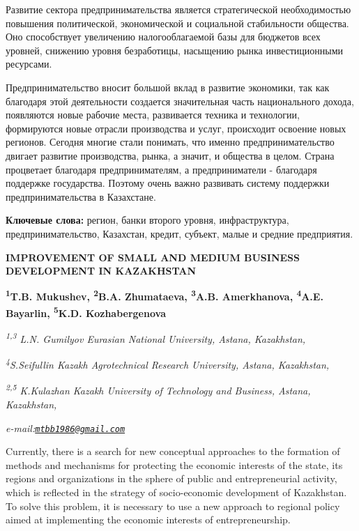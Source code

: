 Развитие сектора предпринимательства является стратегической
необходимостью повышения политической, экономической и социальной
стабильности общества. Оно способствует увеличению налогооблагаемой базы
для бюджетов всех уровней, снижению уровня безработицы, насыщению рынка
инвестиционными ресурсами.

Предпринимательство вносит большой вклад в развитие экономики, так как
благодаря этой деятельности создается значительная часть национального
дохода, появляются новые рабочие места, развивается техника и
технологии, формируются новые отрасли производства и услуг, происходит
освоение новых регионов. Сегодня многие стали понимать, что именно
предпринимательство двигает развитие производства, рынка, а значит, и
общества в целом. Страна процветает благодаря предпринимателям, а
предприниматели - благодаря поддержке государства. Поэтому очень важно
развивать систему поддержки предпринимательства в Казахстане.

{\bfseries Ключевые слова:} регион, банки второго уровня, инфраструктура,
предпринимательство, Казахстан, кредит, субъект, малые и средние
предприятия.

{\bfseries IMPROVEMENT OF SMALL AND MEDIUM BUSINESS DEVELOPMENT IN KAZAKHSTAN}

\begin{articleheader}
{\bfseries
\textsuperscript{1}T.B. Mukushev\textsuperscript{\envelope },
\textsuperscript{2}B.A. Zhumataeva,
\textsuperscript{3}A.B. Amerkhanova,
\textsuperscript{4}A.E. Bayarlin,
\textsuperscript{5}K.D. Kozhabergenova}
\end{articleheader}

\begin{affiliation}
\emph{\textsuperscript{1,3} L.N. Gumilyov Eurasian National University, Astana, Kazakhstan,}

\emph{\textsuperscript{4}S.Seifullin Kazakh Agrotechnical Research University, Astana, Kazakhstan,}

\emph{\textsuperscript{2,5} K.Kulazhan Kazakh University of Technology and Business, Astana, Kazakhstan,}

\emph{e-mail:\href{mailto:mtbb1986@gmail.com}{\nolinkurl{mtbb1986@gmail.com}}}
\end{affiliation}

Currently, there is a search for new conceptual approaches to the
formation of methods and mechanisms for protecting the economic
interests of the state, its regions and organizations in the sphere of
public and entrepreneurial activity, which is reflected in the strategy
of socio-economic development of Kazakhstan. To solve this problem, it
is necessary to use a new approach to regional policy aimed at
implementing the economic interests of entrepreneurship.

